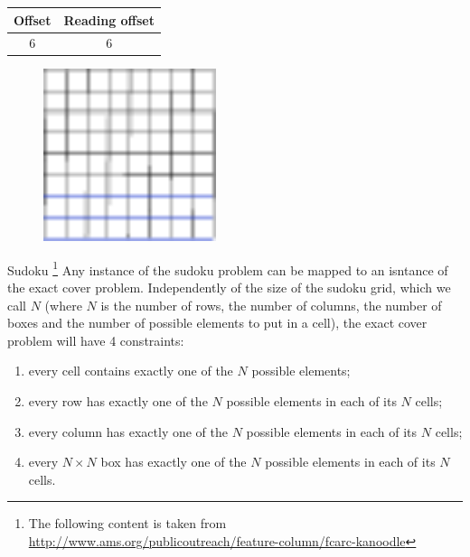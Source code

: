 \documentclass{beamer}
\begin{document}
\begin{frame}{}
    \begin{table}
        \centering
        \begin{tabular}{|c|c|}
            \hline
            Offset & Reading offset \\
            \hline
            6 & 6 \\
            \hline
        \end{tabular}
    \end{table}
    \begin{figure}
        \centering
        \includegraphics[width=0.45\textwidth]{grid_3r_3_ro_3.pdf}
        \label{fig:grid_3r_3_ro_3}
    \end{figure}
\end{frame}


\begin{frame}{Sudoku \footnote[frame]{The following content is 
    taken from \url{http://www.ams.org/publicoutreach/feature-column/fcarc-kanoodle}}}
    Any instance of the sudoku problem can be mapped to an isntance of the exact cover problem.
    Independently of the size of the sudoku grid, which we call $N$ (where $N$ is the number
    of rows, the number of columns, the number of boxes and the number of possible
    elements to put in a cell), the exact cover problem will have 4 constraints:
    \begin{enumerate}
        \item every cell contains exactly one of the $N$ possible elements;
        \item every row has exactly one of the $N$ possible elements in each of its $N$ cells;
        \item every column has exactly one of the $N$ possible elements in each of its $N$ cells;
        \item every $N\times N$ box has exactly one of the $N$ possible elements in each of its $N$ cells.
    \end{enumerate}
\end{frame}
\end{document}
